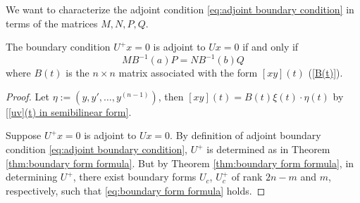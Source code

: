 \documentclass[10.5pt, oneside, a4paper]{article}
\begin{document}
We want to characterize the adjoint condition \eqref{eq:adjoint boundary condition} in terms of the matrices $M, N, P, Q$.

\begin{thm}\label{thm:condition iff adjoint}
    The boundary condition $U^+x=0$ is adjoint to $Ux=0$ if and only if
    \begin{equation}\label{eq:condition iff adjoint}
        MB^{-1}(a)P = NB^{-1}(b)Q
    \end{equation}
    where $B(t)$ is the $n\times n$ matrix associated with the form $[xy](t)$ (\eqref{B(t)}).
\end{thm}
\begin{proof}
    {\color{blue}
    Let $\eta := (y, y', \ldots, y^{(n-1)})$,
    then $[xy](t)=B(t)\xi(t)\cdot \eta(t)$ by \eqref{[uv](t) in semibilinear form}.

    Suppose $U^+x=0$ is adjoint to $Ux=0$. By definition of adjoint boundary condition \ref{eq:adjoint boundary condition}, $U^+$ is determined as in Theorem \ref{thm:boundary form formula}. But by Theorem \ref{thm:boundary form formula}, in determining $U^+$, there exist boundary forms $U_c$, $U_c^+$ of rank $2n-m$ and $m$, respectively, such that \ref{eq:boundary form formula} holds. 

}
\end{proof}
\end{document}
